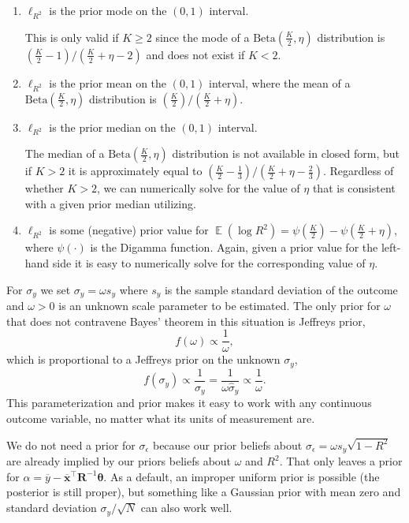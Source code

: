 \documentclass[11pt]{article}
\DeclareMathOperator{\E}{\mathbb{E}}
\begin{document}
\begin{enumerate}
\item $\ell_{R^2}$ is the prior mode on the $\left(0,1\right)$ interval.

This is only valid if $K \geq 2$ since the mode of a
$\mathrm{Beta}\left(\frac{K}{2},\eta\right)$ distribution is \newline
$\left(\frac{K}{2} - 1\right) / \left(\frac{K}{2} + \eta - 2\right)$
and does not exist if $K < 2$.

\item $\ell_{R^2}$ is the prior mean on the $\left(0,1\right)$ interval, where
the mean of a $\mathrm{Beta}\left(\frac{K}{2}, \eta\right)$ distribution is
$\left(\frac{K}{2}\right) / \left(\frac{K}{2} + \eta\right)$.


\item $\ell_{R^2}$ is the prior median on the $\left(0,1\right)$ interval.

The median of a $\mathrm{Beta}\left(\frac{K}{2},\eta\right)$ distribution is not
available in closed form, but if $K > 2$ it is approximately equal to
$\left(\frac{K}{2} - \frac{1}{3}\right) / \left(\frac{K}{2} +
\eta - \frac{2}{3}\right)$.
Regardless of whether $K > 2$, we can numerically solve for the value of $\eta$
that is consistent with a given prior median utilizing.

\item $\ell_{R^2}$ is some (negative) prior value for
$\E\left(\log R^2\right) = \psi\left(\frac{K}{2}\right) -
\psi\left(\frac{K}{2}+\eta\right)$,
where $\psi\left(\cdot\right)$ is the Digamma function. Again, given a prior
value for the left-hand side it is easy to numerically solve for the
corresponding value of $\eta$.
\end{enumerate}


For $\sigma_y$ we set $\sigma_y = \omega s_y$ where $s_y$ is the sample standard
deviation of the outcome and $\omega > 0$ is an unknown scale parameter to be
estimated. The only prior for $\omega$ that does not contravene Bayes' theorem
in this situation is Jeffreys prior,
$$f\left(\omega\right) \propto \frac{1}{\omega},$$
which is proportional to a Jeffreys prior on the unknown $\sigma_y$,
$$f\left(\sigma_y\right) \propto \frac{1}{\sigma_y}
= \frac{1}{\omega \widehat{\sigma}_y} \propto \frac{1}{\omega}.$$
This parameterization and prior makes it easy to work with any continuous
outcome variable, no matter what its units of measurement are.

We do not need a prior for $\sigma_{\epsilon}$ because our prior beliefs about
$\sigma_{\epsilon} = \omega s_y \sqrt{1 - R^2}$ are already implied by our
priors beliefs about $\omega$ and $R^2$. That only leaves a prior for
$\alpha =
\overline{y} - \overline{\mathbf{x}}^\top \mathbf{R}^{-1} \boldsymbol{\theta}$.
As a default, an improper uniform prior is possible (the posterior is still
proper), but something like a Gaussian prior with mean zero and standard
deviation $\sigma_y / \sqrt{N}$ can also work well.
\end{document}
